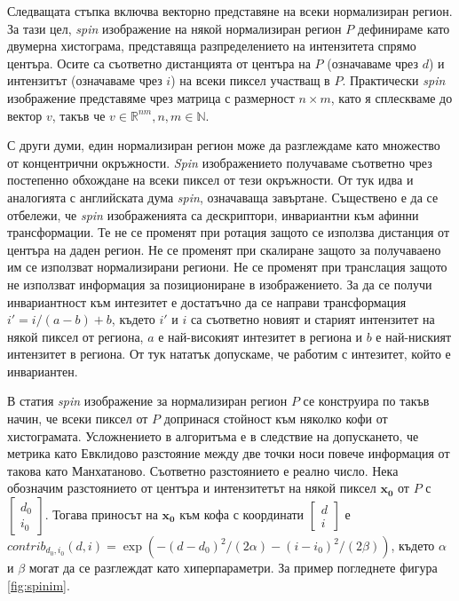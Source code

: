 \documentclass[a4paper,12pt]{article}
\begin{document}
\bigbreak

Следващата стъпка включва векторно представяне на всеки нормализиран регион. За тази цел, \textit{spin} изображение на някой нормализиран регион $P$ дефинираме като двумерна хистограма, представяща разпределението на интензитета спрямо центъра. Осите са съответно дистанцията от центъра на $P$ (означаваме чрез $d$) и интензитът (означаваме чрез $i$) на всеки пиксел участващ в $P$. Практически \textit{spin} изображение представяме чрез матрица с размерност $n \times m$, като я сплескваме до вектор $v$, такъв че $v \in \mathbb{R}^{nm}, n,m \in \mathbb{N}$.

\bigbreak

С други думи, един нормализиран регион може да разглеждаме като множество от концентрични окръжности. \textit{Spin} изображението получаваме съответно чрез постепенно обхождане на всеки пиксел от тези окръжности. От тук идва и аналогията с английската дума \textit{spin}, означаваща завъртане. Съществено е да се отбележи, че \textit{spin} изображенията са дескриптори, инвариантни към афинни трансформации. Те не се променят при ротация защото се използва дистанция от центъра на даден регион. Не се променят при скалиране защото за получаваено им се използват нормализирани региони. Не се променят при транслация защото не използват информация за позициониране в изображението. За да се получи инвариантност към интезитет е достатъчно да се направи трансформация $i' = i / (a-b) + b$, където $i'$ и $i$ са съответно новият и старият интензитет на някой пиксел от региона, $a$ е най-високият интезитет в региона и $b$ е най-ниският интензитет в региона. От тук нататък допускаме, че работим с интезитет, който е инвариантен.

\bigbreak

В статия \cite{spinimages} \textit{spin} изображение за нормализиран регион $P$ се конструира по такъв начин, че всеки пиксел от $P$ допринася стойност към няколко кофи от хистограмата. Усложнението в алгоритъма е в следствие на допускането, че метрика като Евклидово разстояние между две точки носи повече информация от такова като Манхатаново. Съответно разстоянието е реално число. Нека обозначим разстоянието от центъра и интензитетът на някой пиксел $\mathbf{x_0}$ от $P$ с $\begin{bmatrix} d_0 \\ i_0 \end{bmatrix}$. Тогава приносът на $\mathbf{x_0}$ към кофа с координати $\begin{bmatrix} d \\ i \end{bmatrix}$ е $contrib_{d_0,i_0}(d, i) = \exp(-(d-d_0)^2/(2\alpha) - (i-i_0)^2/(2\beta))$, където $\alpha$ и $\beta$ могат да се разглеждат като хиперпараметри. За пример погледнете фигура \ref{fig:spinim}.
\end{document}
